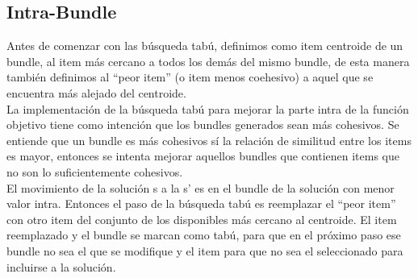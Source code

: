 \subsection{Intra-Bundle}
Antes de comenzar con las búsqueda tabú, definimos como item centroide de un bundle, al item más cercano a todos los demás del mismo bundle, de esta manera también definimos al ``peor item'' (o item menos coehesivo) a aquel que se encuentra más alejado del centroide.\\
La implementación de la búsqueda tabú para mejorar la parte intra de la función objetivo tiene como intención que los bundles generados sean más cohesivos. Se entiende que un bundle es más cohesivos sí la relación de similitud entre los items es mayor, entonces se intenta mejorar aquellos bundles que contienen items que no son lo suficientemente cohesivos.\\
El movimiento de la solución s a la s' es en el bundle de la solución con menor valor intra. Entonces el paso de la búsqueda tabú es reemplazar el ``peor item'' con otro item del conjunto de los disponibles más cercano al centroide. El item reemplazado y el bundle se marcan como tabú, para que en el próximo paso ese bundle no sea el que se modifique y el item para que no sea el seleccionado para incluirse a la solución.
